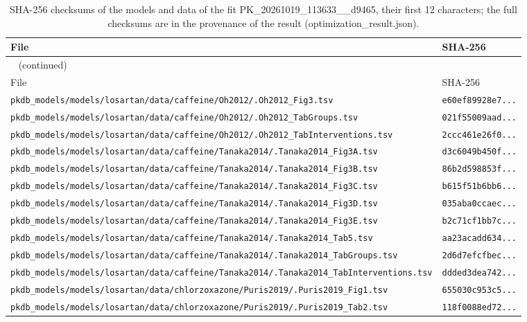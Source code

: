 \documentclass{article}
\begin{document}
\begin{longtable}{ll}
\caption{SHA-256 checksums of the models and data of the fit PK\_20261019\_113633\_\_d9465, their first 12 characters; the full checksums are in the provenance of the result (optimization\_result.json).}\label{tab:checksums:PK_20261019_113633__d9465} \\
\toprule
File & SHA-256 \\
\midrule
\endfirsthead
\multicolumn{2}{l}{\small\tablename~\thetable{} (continued)} \\
\toprule
File & SHA-256 \\
\midrule
\endhead
\bottomrule
\endlastfoot
\texttt{pkdb\_models/models/losartan/data/caffeine/Oh2012/.Oh2012\_Fig3.tsv} & \texttt{e60ef89928e7...} \\
\texttt{pkdb\_models/models/losartan/data/caffeine/Oh2012/.Oh2012\_TabGroups.tsv} & \texttt{021f55009aad...} \\
\texttt{pkdb\_models/models/losartan/data/caffeine/Oh2012/.Oh2012\_TabInterventions.tsv} & \texttt{2ccc461e26f0...} \\
\texttt{pkdb\_models/models/losartan/data/caffeine/Tanaka2014/.Tanaka2014\_Fig3A.tsv} & \texttt{d3c6049b450f...} \\
\texttt{pkdb\_models/models/losartan/data/caffeine/Tanaka2014/.Tanaka2014\_Fig3B.tsv} & \texttt{86b2d598853f...} \\
\texttt{pkdb\_models/models/losartan/data/caffeine/Tanaka2014/.Tanaka2014\_Fig3C.tsv} & \texttt{b615f51b6bb6...} \\
\texttt{pkdb\_models/models/losartan/data/caffeine/Tanaka2014/.Tanaka2014\_Fig3D.tsv} & \texttt{035aba0ccaec...} \\
\texttt{pkdb\_models/models/losartan/data/caffeine/Tanaka2014/.Tanaka2014\_Fig3E.tsv} & \texttt{b2c71cf1bb7c...} \\
\texttt{pkdb\_models/models/losartan/data/caffeine/Tanaka2014/.Tanaka2014\_Tab5.tsv} & \texttt{aa23acadd634...} \\
\texttt{pkdb\_models/models/losartan/data/caffeine/Tanaka2014/.Tanaka2014\_TabGroups.tsv} & \texttt{2d6d7efcfbec...} \\
\texttt{pkdb\_models/models/losartan/data/caffeine/Tanaka2014/.Tanaka2014\_TabInterventions.tsv} & \texttt{ddded3dea742...} \\
\texttt{pkdb\_models/models/losartan/data/chlorzoxazone/Puris2019/.Puris2019\_Fig1.tsv} & \texttt{655030c953c5...} \\
\texttt{pkdb\_models/models/losartan/data/chlorzoxazone/Puris2019/.Puris2019\_Tab2.tsv} & \texttt{118f0088ed72...} \\

\end{longtable}
\end{document}
